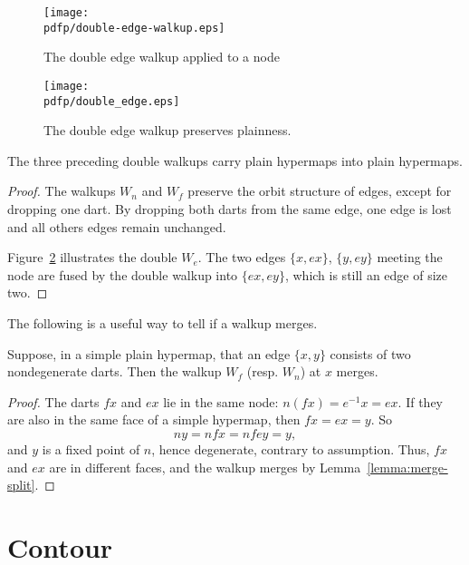 \begin{figure}[htb]
  \centering
  \texttt{[image: \\pdfp/double-edge-walkup.eps]}
  \caption{The double edge walkup applied to a node}
  \label{fig:doubleedge}
\end{figure}

\begin{figure}[htb]
  \centering
  \texttt{[image: \\pdfp/double\_edge.eps]}
  \caption{The double edge walkup preserves plainness.}
  \label{fig:doubleplain}
\end{figure}


\begin{lemma}  
The three preceding double walkups carry plain
hypermaps into plain hypermaps.
\end{lemma}

\begin{proof} The walkups $W_n$ and $W_f$ preserve the orbit structure of edges, except for dropping one dart.  By dropping both darts from the same edge, one edge is lost and all others edges remain unchanged.

Figure~\ref{fig:doubleplain} illustrates the double $W_e$.  The two edges $\{x,e x\}$, $\{y, e y\}$ meeting the node are fused by the double walkup into $\{e x, e y\}$, which is still an edge of size two.
\end{proof}

The following is a useful way to tell if a walkup merges.


\begin{lemma}  
Suppose, in a simple plain hypermap, that an edge $\{x,y\}$ consists of two nondegenerate darts.  Then the walkup  $W_f$ (resp. $W_n$) at $x$  merges.
\end{lemma}

\begin{proof} 
The darts $f x$ and $e x$ lie in the same node: $n (f x) = e^{-1} x = e x$. If they are also in the same face of a simple hypermap, then $f x = e x
= y$. So 
  $$n y  = n f x = n f e y = y,$$
and $y$ is a fixed
point of $n$, hence degenerate, contrary to assumption.  
Thus, $f x$ and $e x$ are in different faces, and the walkup merges
by Lemma~\ref{lemma:merge-split}.  
\end{proof}




\section{Contour}



